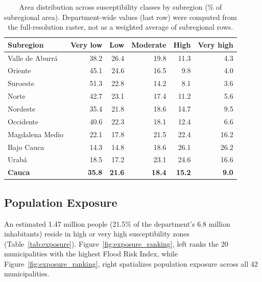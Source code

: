 \documentclass{article}
\begin{document}
\begin{table}[htbp]
\caption{Area distribution across susceptibility classes by subregion (\% of subregional area). Department-wide values (last row) were computed from the full-resolution raster, not as a weighted average of subregional rows.}
\label{tab:suscept_area}
\centering
\footnotesize
\begin{tabular}{lrrrrr}
\toprule
\textbf{Subregion} & \textbf{Very low} & \textbf{Low} & \textbf{Moderate} & \textbf{High} & \textbf{Very high} \\
\midrule
Valle de Aburr\'a   & 38.2 & 26.4 & 19.8 & 11.3 & 4.3 \\
Oriente              & 45.1 & 24.6 & 16.5 & 9.8 & 4.0 \\
Suroeste             & 51.3 & 22.8 & 14.2 & 8.1 & 3.6 \\
Norte                & 42.7 & 23.1 & 17.4 & 11.2 & 5.6 \\
Nordeste             & 35.4 & 21.8 & 18.6 & 14.7 & 9.5 \\
Occidente            & 40.6 & 22.3 & 18.1 & 12.4 & 6.6 \\
Magdalena Medio      & 22.1 & 17.8 & 21.5 & 22.4 & 16.2 \\
Bajo Cauca           & 14.3 & 14.8 & 18.6 & 26.1 & 26.2 \\
Urab\'a              & 18.5 & 17.2 & 23.1 & 24.6 & 16.6 \\
\midrule
\textbf{Cauca}   & \textbf{35.8} & \textbf{21.6} & \textbf{18.4} & \textbf{15.2} & \textbf{9.0} \\
\bottomrule
\end{tabular}
\end{table}

\subsection{Population Exposure}

An estimated 1.47 million people (21.5\% of the department's 6.8 million inhabitants) reside in high or very high susceptibility zones (Table~\ref{tab:exposure}). Figure~\ref{fig:exposure_ranking}, left ranks the 20 municipalities with the highest Flood Risk Index, while Figure~\ref{fig:exposure_ranking}, right spatializes population exposure across all 42 municipalities.
\end{document}

